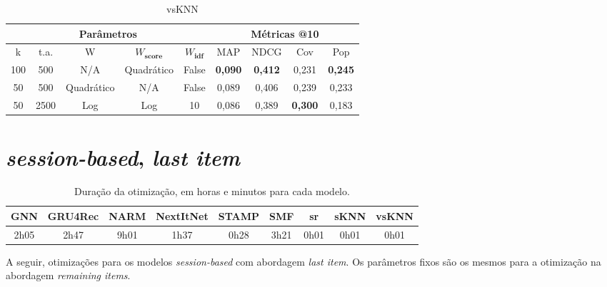 \begin{table}[htbp]
  \centering
  \begin{tabular}{|c|c|c|c|c|c|c|c|c|}
    \hline
      \multicolumn{5}{|c|}{Parâmetros} & \multicolumn{4}{c|}{Métricas @10} \\
      \hline
      k & t.a. & W & $W_{\textbf{score}}$ & $W_{\textbf{idf}}$ & MAP & NDCG & Cov & Pop \\
      \hline
      100 & 500 & N/A & Quadrático & False & \textbf{0,090} & \textbf{0,412} & 0,231 & \textbf{0,245} \\
      \hline
      50 & 500 & Quadrático & N/A & False & 0,089 & 0,406 & 0,239 & 0,233 \\
      \hline
      50 & 2500 & Log & Log & 10 & 0,086 & 0,389 & \textbf{0,300} & 0,183 \\
      \hline
\end{tabular}
      \caption{vsKNN}
      \label{opt:vsknn_rem}
\end{table}

\newpage

\section{\textit{session-based}, \textit{last item}}

\begin{table}[htbp]
  \centering
  \begin{tabular}{|c|c|c|c|c|c|c|c|c|}
      \hline
      GNN & GRU4Rec & NARM & NextItNet & STAMP & SMF & sr & sKNN & vsKNN \\
      \hline
      2h05 & 2h47 & 9h01 & 1h37 & 0h28 &  3h21 & 0h01 & 0h01 & 0h01 \\
      \hline
      \end{tabular}
      \caption{Duração da otimização, em horas e minutos para cada modelo.}
\end{table}

A seguir, otimizações para os modelos \textit{session-based} com abordagem \textit{last
item}. Os parâmetros fixos são os mesmos para a otimização na abordagem \textit{remaining items}.

